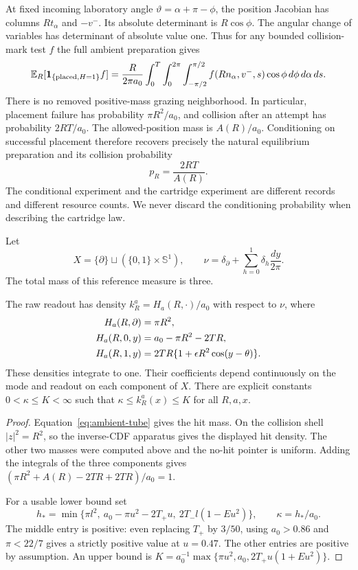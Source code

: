 At fixed incoming laboratory angle $\vartheta=\alpha+\pi-\phi$, the position
Jacobian has columns $Rt_\alpha$ and $-v^-$. Its absolute determinant is
$R\cos\phi$. The angular change of variables has determinant of absolute
value one. Thus for any bounded collision-mark test $f$ the full ambient
preparation gives
\begin{equation}
 \mathbb E_R[\mathbf1_{\{\mathrm{placed},H=1\}}f]
 =\frac{R}{2\pi a_0}
 \int_0^T\int_0^{2\pi}\int_{-\pi/2}^{\pi/2}
 f(Rn_\alpha,v^-,s)\cos\phi\,d\phi\,d\alpha\,ds.
 \label{eq:ambient-tube}
\end{equation}
There is no removed positive-mass grazing neighborhood. In particular,
placement failure has probability $\pi R^2/a_0$, and collision after an
attempt has probability $2RT/a_0$. The allowed-position mass is $A(R)/a_0$.
Conditioning on successful placement therefore recovers precisely the
natural equilibrium preparation and its collision probability
\begin{equation}
 p_R=\frac{2RT}{A(R)}.
 \label{eq:conditional-equilibrium}
\end{equation}
The conditional experiment and the cartridge experiment are different
records and different resource counts. We never discard the conditioning
probability when describing the cartridge law.

Let
\[
 X=\{\partial\}\sqcup(\{0,1\}\times\mathbb S^1),\qquad
 \nu=\delta_\partial+\sum_{h=0}^1\delta_h\frac{dy}{2\pi}.
\]
The total mass of this reference measure is three.
\begin{proposition}\label{prop:raw}
The raw readout has density $k_R^a=H_a(R,\cdot)/a_0$ with respect to $\nu$,
where
\begin{align}
 H_a(R,\partial)&=\pi R^2,\notag\\
 H_a(R,0,y)&=a_0-\pi R^2-2TR,\notag\\
 H_a(R,1,y)&=2TR\{1+\epsilon R^2\cos(y-\theta)\}.
 \label{eq:raw-kernel}
\end{align}
These densities integrate to one. Their coefficients depend continuously
on the mode and readout on each component of $X$. There are explicit
constants $0<\kappa\le K<\infty$ such that
$\kappa\le k_R^a(x)\le K$ for all $R,a,x$.
\end{proposition}
\begin{proof}
Equation~\eqref{eq:ambient-tube} gives the hit mass. On the collision shell
$|z|^2=R^2$, so the inverse-CDF apparatus gives the displayed hit density.
The other two masses were computed above and the no-hit pointer is uniform.
Adding the integrals of the three components gives
$(\pi R^2+A(R)-2TR+2TR)/a_0=1$.

For a usable lower bound set
\begin{equation}
 h_* =\min\{\pi l^2,\ a_0-\pi u^2-2T_+u,
                   \ 2T_-l(1-Eu^2)\},\qquad \kappa=h_*/a_0.
 \label{eq:lower-bound}
\end{equation}
The middle entry is positive: even replacing $T_+$ by $3/50$, using
$a_0>0.86$ and $\pi<22/7$ gives a strictly positive value at $u=0.47$.
The other entries are positive by assumption. An upper bound is
$K=a_0^{-1}\max\{\pi u^2,a_0,2T_+u(1+Eu^2)\}$.
\end{proof}


